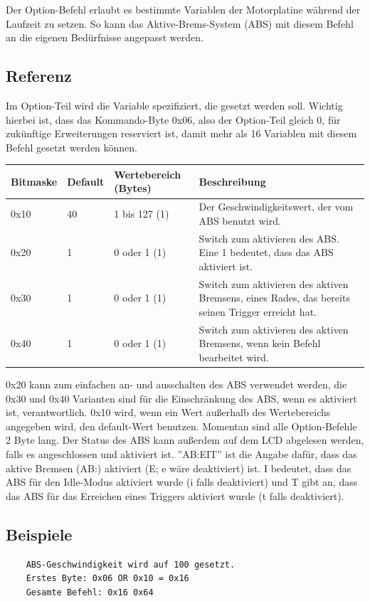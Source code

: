 \documentclass[a4paper]{article}
\begin{document}
	Der Option-Befehl erlaubt es bestimmte Variablen der Motorplatine
	während der Laufzeit zu setzen. So kann das Aktive-Brems-System (ABS)
	mit diesem Befehl an die eigenen Bedürfnisse angepasst werden.

	\subsection{Referenz}

	Im Option-Teil wird die Variable spezifiziert, die gesetzt werden soll.
	Wichtig hierbei ist, dass das Kommando-Byte 0x06, also der Option-Teil
	gleich 0, für zukünftige Erweiterungen reserviert ist, damit mehr als
	16 Variablen mit diesem Befehl gesetzt werden können.

	\begin{tabularx}{\linewidth}{|l|l|l|X|}
		\hline
		\textbf{Bitmaske} & \textbf{Default} & \textbf{Wertebereich (Bytes)} & \textbf{Beschreibung} \\
		\hline
		\hline
		0x10 & 40 & 1 bis 127 (1) & Der Geschwindigkeitswert, der vom ABS benutzt wird. \\
		\hline
		0x20 & 1 & 0 oder 1 (1) & Switch zum aktivieren des ABS. Eine 1 bedeutet, dass das ABS aktiviert ist. \\
		\hline
		0x30 & 1 & 0 oder 1 (1) & Switch zum aktivieren des aktiven Bremsens, eines Rades, das bereits seinen Trigger erreicht hat. \\
		\hline
		0x40 & 1 & 0 oder 1 (1) & Switch zum aktivieren des aktiven Bremsens, wenn kein Befehl bearbeitet wird. \\
		\hline
	\end{tabularx}

	0x20 kann zum einfachen an- und ausschalten des ABS verwendet werden,
	die 0x30 und 0x40 Varianten sind für die Einschränkung des ABS, wenn es
	aktiviert ist, verantwortlich. 0x10 wird, wenn ein Wert außerhalb des Wertebereichs
	angegeben wird, den default-Wert benutzen. Momentan sind alle Option-Befehle 2 Byte lang.
	Der Status des ABS kann außerdem auf dem LCD abgelesen werden, falls es angeschlossen
	und aktiviert ist. ''AB:EIT'' ist die Angabe dafür, dass das aktive Bremsen (AB:) aktiviert
	(E; e wäre deaktiviert) ist. I bedeutet, dass das ABS für den Idle-Modus aktiviert wurde
	(i falls deaktiviert) und T gibt an, dass das ABS für das Erreichen eines Triggers
	aktiviert wurde (t falls deaktiviert).

	\subsection{Beispiele}
	\begin{verbatim}
	ABS-Geschwindigkeit wird auf 100 gesetzt.
	Erstes Byte: 0x06 OR 0x10 = 0x16
	Gesamte Befehl: 0x16 0x64
	\end{verbatim}
	\pagebreak
\end{document}
